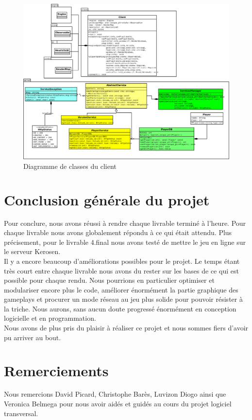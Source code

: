 \documentclass[12pt,a4paper]{article}
\begin{document}
\begin{figure}[!ht]
\centering
    \includegraphics[width=1\textwidth]{ressources/module.png}
     \caption{Diagramme de classes du client}
\end{figure}
\newpage
\section{Conclusion générale du projet}
Pour conclure, nous avons réussi à rendre chaque livrable terminé à l'heure. Pour chaque livrable nous avons globalement répondu à ce qui était attendu. Plus précisement, pour le livrable 4.final nous avons testé de mettre le jeu en ligne sur le serveur Kerosen.\\ 
Il y a encore beaucoup d'améliorations possibles pour le projet. Le temps étant très court entre chaque livrable nous avons du rester sur les bases de ce qui est possible pour chaque rendu. Nous pourrions en particulier optimiser et modulariser encore plus le code, améliorer énormément la partie graphique des gameplays et procurer un mode réseau au jeu plus solide pour pouvoir résister à la triche.
Nous aurons, sans aucun doute progressé énormément en conception logicielle et en programmation.\\
Nous avons de plus pris du plaisir à réaliser ce projet et nous sommes fiers d'avoir pu arriver au bout.
\newpage

\section{Remerciements}
Nous remercions David Picard, Christophe Barès, Luvizon Diogo ainsi que Veronica Belmega pour nous avoir aidés et guidés au cours du projet logiciel transversal.
\end{document}

